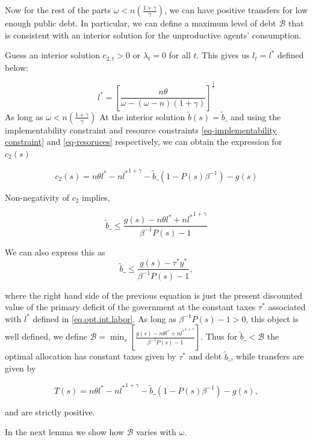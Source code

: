 \documentclass[thmsb,11pt]{article}
\begin{document}
Now for the rest of the parts $\omega<n\left(\frac{1+\gamma}{\gamma}\right)$, we can have positive transfers for low enough public debt. In particular, we can define a maximum level of debt $\mathcal{B}$ that is consistent with an interior solution for the unproductive agents' consumption.

Guess an interior solution $c_{2,t}>0$ or $\lambda_t=0$ for all $t$. This gives us $l_t=l^*$ defined below:

\begin{equation}
\label{eq.opt.int.labor}
l^*=\left[\frac{n\theta}{\omega-(\omega-n)(1+\gamma)}\right]^{\frac{1}{\gamma}}
\end{equation}
As long as $\omega<n \left(\frac{1+\gamma}{\gamma}\right)$
At the interior solution $\tilde{b}(s)=\tilde b\_$ and using the implementability  constraint and resource constraints \eqref{eq-implementability constraint} and \eqref{eq-resoruces} respectively, we can obtain the expression for $c_{2}(s)$

\[c_{2}(s)=n \theta l^{*}-n {l^*}^{1+\gamma}-\tilde{b}\_(1-P(s)\beta^{-1})-g(s)\]

Non-negativity of $c_2$ implies,


\[\tilde{b}\_\leq \frac{g(s)-n\theta l^*+n{l^*}^{1+\gamma}}{\beta^{-1}P(s)-1}\]


We can also express this as
\[\tilde{b}\_\leq \frac{g(s)-\tau^*y^* }{\beta^{-1}P(s)-1},\]


where the right hand side of the previous equation is just the present discounted value of the primary deficit of the government at the constant taxes $\tau^*$ associated with $l^*$ defined in \eqref{eq.opt.int.labor}.
As long as $\beta^{-1}P(s)-1>0$, this object is well defined, we define $\mathcal{B}=\min_{s}\left[\frac{g(s)-n\theta l^*+n{l^*}^{1+\gamma}}{\beta^{-1}P(s)-1}\right]$.  Thus for $\tilde{b}\_<\mathcal{B}$ the optimal allocation has constant taxes given by $\tau^*$ and debt $\tilde{b}\_$, while  transfers are given by

\[T(s)=n \theta l^{*}-n {l^*}^{1+\gamma}-\tilde{b}\_(1-P(s)\beta^{-1})-g(s),\]

and are strictly positive.

In the next lemma we show how $\mathcal{B}$ varies with $\omega$.
\end{document}
